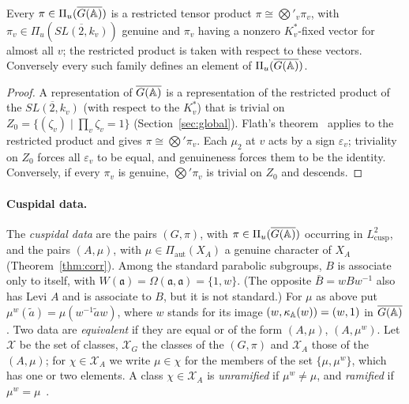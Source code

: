 \begin{lemma}\label{lem:factor}
Every $\pi\in\Pi_u(\overline{G(\mathbb{A})})$ is a restricted tensor product
$\pi\cong\bigotimes'_v\pi_v$, with $\pi_v\in\Pi_u(\overline{SL(2,k_v)})$
genuine and $\pi_v$ having a nonzero $K_v^*$-fixed vector for almost all
$v$; the restricted product is taken with respect to these vectors.
Conversely every such family defines an element of $\Pi_u(\overline{G(\mathbb{A})})$.
\end{lemma}

\begin{proof}
A representation of $\overline{G(\mathbb{A})}$ is a representation of the restricted product
of the $\overline{SL(2,k_v)}$ (with respect to the $K_v^*$) that is
trivial on $Z_0=\{(\zeta_v)\mid\prod_v\zeta_v=1\}$
(Section~\ref{sec:global}). Flath's theorem~\cite{Fl79} applies to the
restricted product and gives $\pi\cong\bigotimes'\pi_v$. Each $\mu_2$ at
$v$ acts by a sign $\varepsilon_v$; triviality on $Z_0$ forces all
$\varepsilon_v$ to be equal, and genuineness forces them to be the
identity. Conversely, if every $\pi_v$ is genuine, $\bigotimes'\pi_v$ is
trivial on $Z_0$ and descends.
\end{proof}

\paragraph{Cuspidal data.} The \emph{cuspidal data} are the pairs
$(G,\pi)$, with $\pi\in\Pi_u(\overline{G(\mathbb{A})})$ occurring in $L^2_{\mathrm{cusp}}$, and
the pairs $(A,\mu)$, with $\mu\in\Pi_{\mathrm{aut}}(X_A)$ a genuine
character of $X_A$ (Theorem~\ref{thm:corr}). Among the standard
parabolic subgroups, $B$ is associate only to itself, with
$W(\mathfrak a)=\Omega(\mathfrak a,\mathfrak a)=\{1,w\}$. (The opposite
$\bar B=wBw^{-1}$ also has Levi $A$ and is associate to $B$, but it is not
standard.) For $\mu$ as above put
$\mu^w(\tilde a)=\mu(w^{-1}\tilde aw)$, where $w$ stands for its image
$(w,\kappa_{\mathbb{A}}(w))=(w,1)$ in $\overline{G(\mathbb{A})}$. Two data are \emph{equivalent} if they
are equal or of the form $(A,\mu)$, $(A,\mu^w)$. Let $\mathcal X$ be the
set of classes, $\mathcal X_G$ the classes of the $(G,\pi)$ and
$\mathcal X_A$ those of the $(A,\mu)$; for $\chi\in\mathcal X_A$ we write
$\mu\in\chi$ for the members of the set $\{\mu,\mu^w\}$, which has one or
two elements. A class $\chi\in\mathcal X_A$ is \emph{unramified} if
$\mu^w\ne\mu$, and \emph{ramified} if $\mu^w=\mu$~\cite[\S4]{Ar80}.

